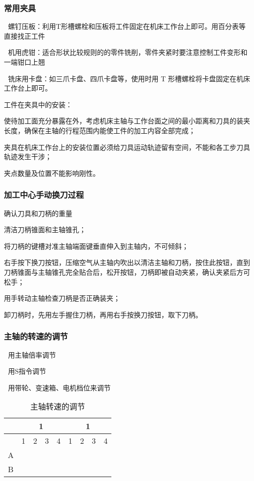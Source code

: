 \subsubsection{常用夹具}

	螺钉压板：利用T形槽螺栓和压板将工件固定在机床工作台上即可。用百分表等直接找正工件

	机用虎钳：适合形状比较规则的的零件铣削，零件夹紧时要注意控制工件变形和一端钳口上翘

	铣床用卡盘：如三爪卡盘、四爪卡盘等，使用时用 T 形槽螺栓将卡盘固定在机床工作台上即可。

工件在夹具中的安装：

	使待加工面充分暴露在外，考虑机床主轴与工作台面之间的最小距离和刀具的装夹长度，确保在主轴的行程范围内能使工件的加工内容全部完成； 

	夹具在机床工作台上的安装位置必须给刀具运动轨迹留有空间，不能和各工步刀具轨迹发生干涉； 

	夹点数量及位置不能影响刚性。

\subsubsection{加工中心手动换刀过程}
确认刀具和刀柄的重量 

清洁刀柄锥面和主轴锥孔； 

将刀柄的键槽对准主轴端面键垂直伸入到主轴内，不可倾斜； 

右手按下换刀按钮，压缩空气从主轴内吹出以清洁主轴和刀柄，按住此按钮，直到刀柄锥面与主轴锥孔完全贴合后，松开按钮，刀柄即被自动夹紧，确认夹紧后方可松手； 

用手转动主轴检查刀柄是否正确装夹； 

卸刀柄时，先用左手握住刀柄，再用右手按换刀按钮，取下刀柄。 

\subsubsection{主轴的转速的调节} 

	用主轴倍率调节

	用S指令调节

	用带轮、变速箱、电机档位来调节



\begin{table}
		\caption{主轴转速的调节}
		\centering
	\begin{tabular}{|c|c|c|c|c|c|c|c|c|}
		\hline 
		&  \multicolumn{4}{c|}{1}& \multicolumn{4}{c|}{1} \\ 
		\hline 
		& 1 & 2 & 3 & 4 & 1 & 2 & 3 & 4 \\ 
		\hline 
		A&  &  &  &  &  &  &  &  \\ 
		\hline 
		B&  &  &  &  &  &  &  &  \\ 
		\hline 
	\end{tabular} 
\end{table}

